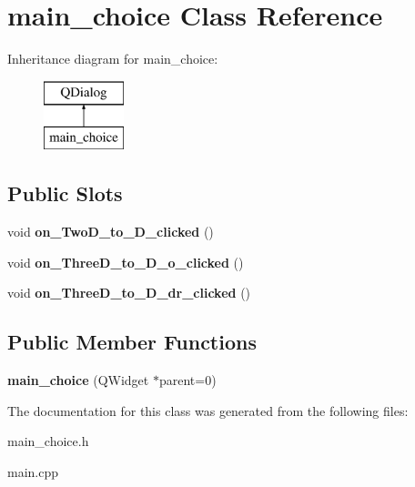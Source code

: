 \hypertarget{classmain__choice}{}\section{main\+\_\+choice Class Reference}
\label{classmain__choice}
Inheritance diagram for main\+\_\+choice\+:\begin{figure}[H]
\begin{center}
\leavevmode
\includegraphics[height=2.000000cm]{classmain__choice}
\end{center}
\end{figure}
\subsection*{Public Slots}
\begin{DoxyCompactItemize}
\item 
\mbox{\label{classmain__choice_a2982ce0c586042302c93288214b87a94}} 
void {\bfseries on\+\_\+\+Two\+D\+\_\+to\+\_\+D\+\_\+clicked} ()
\item 
\mbox{\label{classmain__choice_aba751377bcb77dd148b20dcac4e7137c}} 
void {\bfseries on\+\_\+\+Three\+D\+\_\+to\+\_\+D\+\_\+o\+\_\+clicked} ()
\item 
\mbox{\label{classmain__choice_af3e5bf8f7a7524cc57635063ed629b2b}} 
void {\bfseries on\+\_\+\+Three\+D\+\_\+to\+\_\+D\+\_\+dr\+\_\+clicked} ()
\end{DoxyCompactItemize}
\subsection*{Public Member Functions}
\begin{DoxyCompactItemize}
\item 
\mbox{\label{classmain__choice_af3597c64880a8aab73fe55f125ffc995}} 
{\bfseries main\+\_\+choice} (Q\+Widget $\ast$parent=0)
\end{DoxyCompactItemize}


The documentation for this class was generated from the following files\+:\begin{DoxyCompactItemize}
\item 
main\+\_\+choice.\+h\item 
main.\+cpp\end{DoxyCompactItemize}
